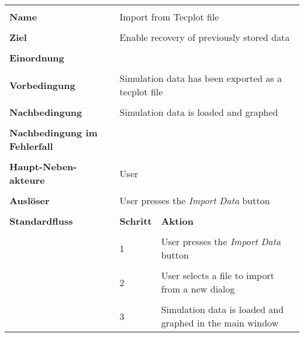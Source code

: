 {\begin{tabular}{|p{5cm}|p{2cm}|p{3cm}|}
\hline \\
\textbf{Name} & \multicolumn{2}{p{5cm}|}{Import from Tecplot file} \\
\hline \\
\textbf{Ziel} & \multicolumn{2}{p{5cm}|}{Enable recovery of previously stored data} \\
\hline \\
\textbf{Einordnung} & \multicolumn{2}{p{5cm}|}{} \\
\hline \\
\textbf{Vorbedingung} & \multicolumn{2}{p{5cm}|}{Simulation data has been exported as a tecplot file} \\
\hline \\
\textbf{Nachbedingung} & \multicolumn{2}{p{5cm}|}{Simulation data is loaded and graphed} \\
\hline \\
\textbf{Nachbedingung im Fehlerfall} & \multicolumn{2}{p{5cm}|}{}\\
\hline \\
\textbf{Haupt-Neben-akteure} & \multicolumn{2}{p{5cm}|}{User} \\
\hline \\
\textbf{Ausl\"oser} & \multicolumn{2}{p{5cm}|}{User presses the \textit{Import Data} button} \\
\hline \\
\textbf{Standardfluss} & \textbf{Schritt}& \textbf{Aktion} \\
\hline \\
& 1 & User presses the \textit{Import Data} button \\
\hline \\
& 2 & User selects a file to import from a new dialog \\
\hline \\
& 3 & Simulation data is loaded and graphed in the main window \\
\hline
\end{tabular}

}
